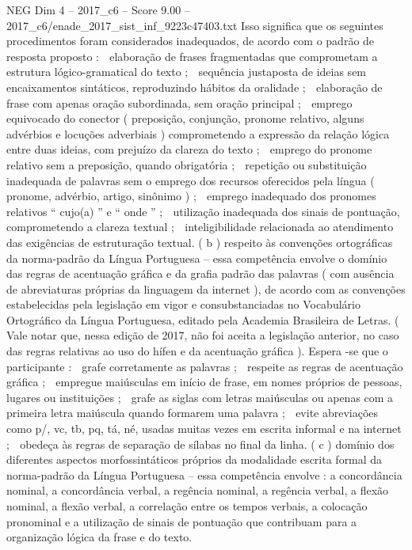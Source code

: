 \begin{textsample}{NEG Dim 4 – 2017\_c6 – Score 9.00 – 2017\_c6/enade\_2017\_sist\_inf\_9223c47403.txt}
Isso significa que os seguintes procedimentos foram considerados inadequados, de acordo com o padrão de resposta proposto :  elaboração de frases fragmentadas que comprometam a estrutura lógico-gramatical do texto ;  sequência justaposta de ideias sem encaixamentos sintáticos, reproduzindo hábitos da oralidade ;  elaboração de frase com apenas oração subordinada, sem oração principal ;  emprego equivocado do conector ( preposição, conjunção, pronome relativo, alguns advérbios e locuções adverbiais ) comprometendo a expressão da relação lógica entre duas ideias, com prejuízo da clareza do texto ;  emprego do pronome relativo sem a preposição, quando obrigatória ;  repetição ou substituição inadequada de palavras sem o emprego dos recursos oferecidos pela língua ( pronome, advérbio, artigo, sinônimo ) ;  emprego inadequado dos pronomes relativos “ cujo(a) ” e “ onde ” ;  utilização inadequada dos sinais de pontuação, comprometendo a clareza textual ;  inteligibilidade relacionada ao atendimento das exigências de estruturação textual. ( b ) respeito às convenções ortográficas da norma-padrão da Língua Portuguesa – essa competência envolve o domínio das regras de acentuação gráfica e da grafia padrão das palavras ( com ausência de abreviaturas próprias da linguagem da internet ), de acordo com as convenções estabelecidas pela legislação em vigor e consubstanciadas no Vocabulário Ortográfico da Língua Portuguesa, editado pela Academia Brasileira de Letras. ( Vale notar que, nessa edição de 2017, não foi aceita a legislação anterior, no caso das regras relativas ao uso do hífen e da acentuação gráfica ).
Espera -se que o participante :  grafe corretamente as palavras ;  respeite as regras de acentuação gráfica ;  empregue maiúsculas em início de frase, em nomes próprios de pessoas, lugares ou instituições ;  grafe as siglas com letras maiúsculas ou apenas com a primeira letra maiúscula quando formarem uma palavra ;  evite abreviações como p/, vc, tb, pq, tá, né, usadas muitas vezes em escrita informal e na internet ;  obedeça às regras de separação de sílabas no final da linha. ( c ) domínio dos diferentes aspectos morfossintáticos próprios da modalidade escrita formal da norma-padrão da Língua Portuguesa – essa competência envolve : a concordância nominal, a concordância verbal, a regência nominal, a regência verbal, a flexão nominal, a flexão verbal, a correlação entre os tempos verbais, a colocação pronominal e a utilização de sinais de pontuação que contribuam para a organização lógica da frase e do texto.

\end{textsample}

